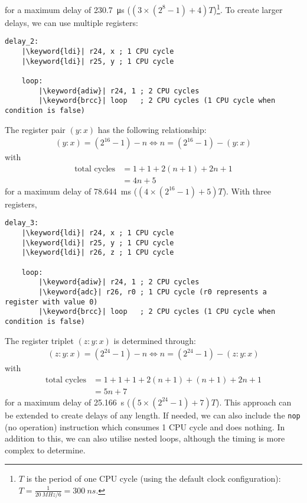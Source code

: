 \documentclass{article}
\newcommand{\keyword}[1]{\textcolor[rgb]{0.00,0.50,0.00}{\textbf{#1}}}
\begin{document}
for a maximum delay of \qty{230.7}{\micro s} (\(\left( 3 \times \left( 2^8 - 1 \right) + 4 \right) T\))\footnote{\(T\) is the period of one CPU cycle (using the default clock configuration): \(T = \frac{1}{\qty{20}{MHz} / 6} = \qty{300}{ns}\).}.
To create larger delays, we can use multiple registers:
\begin{verbatim}
delay_2:
    |\keyword{ldi}| r24, x ; 1 CPU cycle
    |\keyword{ldi}| r25, y ; 1 CPU cycle

    loop:
        |\keyword{adiw}| r24, 1 ; 2 CPU cycles
        |\keyword{brcc}| loop   ; 2 CPU cycles (1 CPU cycle when condition is false)
\end{verbatim}
The register pair \(\left( y:x \right)\) has the following
relationship:
\begin{align*}
    \left( y:x \right) = \left( 2^{16} - 1 \right) - n \iff n = \left( 2^{16} - 1 \right) - \left( y:x \right)
\end{align*}
with
\begin{align*}
    \text{total cycles} & = 1 + 1 + 2 \left( n + 1 \right) + 2 n + 1 \\
                        & = 4n + 5
\end{align*}
for a maximum delay of \qty{78.644}{ms} (\(\left(4 \times \left( 2^{16} - 1 \right) + 5 \right) T\)).
With three registers,
\begin{verbatim}
delay_3:
    |\keyword{ldi}| r24, x ; 1 CPU cycle
    |\keyword{ldi}| r25, y ; 1 CPU cycle
    |\keyword{ldi}| r26, z ; 1 CPU cycle

    loop:
        |\keyword{adiw}| r24, 1 ; 2 CPU cycles
        |\keyword{adc}| r26, r0 ; 1 CPU cycle (r0 represents a register with value 0)
        |\keyword{brcc}| loop   ; 2 CPU cycles (1 CPU cycle when condition is false)
\end{verbatim}
The register triplet \(\left( z:y:x \right)\) is determined through:
\begin{align*}
    \left( z:y:x \right) = \left( 2^{24} - 1 \right) - n \iff n = \left( 2^{24} - 1 \right) - \left( z:y:x \right)
\end{align*}
with
\begin{align*}
    \text{total cycles} & = 1 + 1 + 1 + 2 \left( n + 1 \right) + \left( n + 1 \right) + 2 n + 1 \\
                        & = 5n + 7
\end{align*}
for a maximum delay of \qty{25.166}{s} (\(\left(5 \times \left( 2^{24} - 1 \right) + 7 \right) T\)).
This approach can be extended to create delays of any length.
If needed, we can also include the \texttt{nop} (no
operation) instruction which consumes 1 CPU cycle and does nothing. In
addition to this, we can also utilise nested loops, although the timing
is more complex to determine.
\end{document}
